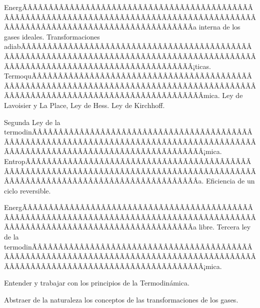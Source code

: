 \begin{sumilla}
\begin{unit}
\begin{topicos}
      \item EnergÃÂÃÂÃÂÃÂÃÂÃÂÃÂÃÂÃÂÃÂÃÂÃÂÃÂÃÂÃÂÃÂÃÂÃÂÃÂÃÂÃÂÃÂÃÂÃÂÃÂÃÂÃÂÃÂÃÂÃÂÃÂÃÂÃÂÃÂÃÂÃÂÃÂÃÂÃÂÃÂÃÂÃÂÃÂÃÂÃÂÃÂÃÂÃÂÃÂÃÂÃÂÃÂÃÂÃÂÃÂÃÂÃÂÃÂÃÂÃÂÃÂÃÂÃÂÃÂ­a interna de los gases ideales. Transformaciones adiabÃÂÃÂÃÂÃÂÃÂÃÂÃÂÃÂÃÂÃÂÃÂÃÂÃÂÃÂÃÂÃÂÃÂÃÂÃÂÃÂÃÂÃÂÃÂÃÂÃÂÃÂÃÂÃÂÃÂÃÂÃÂÃÂÃÂÃÂÃÂÃÂÃÂÃÂÃÂÃÂÃÂÃÂÃÂÃÂÃÂÃÂÃÂÃÂÃÂÃÂÃÂÃÂÃÂÃÂÃÂÃÂÃÂÃÂÃÂÃÂÃÂÃÂÃÂÃÂ¡ticas. TermoquÃÂÃÂÃÂÃÂÃÂÃÂÃÂÃÂÃÂÃÂÃÂÃÂÃÂÃÂÃÂÃÂÃÂÃÂÃÂÃÂÃÂÃÂÃÂÃÂÃÂÃÂÃÂÃÂÃÂÃÂÃÂÃÂÃÂÃÂÃÂÃÂÃÂÃÂÃÂÃÂÃÂÃÂÃÂÃÂÃÂÃÂÃÂÃÂÃÂÃÂÃÂÃÂÃÂÃÂÃÂÃÂÃÂÃÂÃÂÃÂÃÂÃÂÃÂÃÂ­mica. Ley de Lavoisier y La Place, Ley de Hess. Ley de Kirchhoff.
      \item Segunda Ley de la termodinÃÂÃÂÃÂÃÂÃÂÃÂÃÂÃÂÃÂÃÂÃÂÃÂÃÂÃÂÃÂÃÂÃÂÃÂÃÂÃÂÃÂÃÂÃÂÃÂÃÂÃÂÃÂÃÂÃÂÃÂÃÂÃÂÃÂÃÂÃÂÃÂÃÂÃÂÃÂÃÂÃÂÃÂÃÂÃÂÃÂÃÂÃÂÃÂÃÂÃÂÃÂÃÂÃÂÃÂÃÂÃÂÃÂÃÂÃÂÃÂÃÂÃÂÃÂÃÂ¡mica. EntropÃÂÃÂÃÂÃÂÃÂÃÂÃÂÃÂÃÂÃÂÃÂÃÂÃÂÃÂÃÂÃÂÃÂÃÂÃÂÃÂÃÂÃÂÃÂÃÂÃÂÃÂÃÂÃÂÃÂÃÂÃÂÃÂÃÂÃÂÃÂÃÂÃÂÃÂÃÂÃÂÃÂÃÂÃÂÃÂÃÂÃÂÃÂÃÂÃÂÃÂÃÂÃÂÃÂÃÂÃÂÃÂÃÂÃÂÃÂÃÂÃÂÃÂÃÂÃÂ­a. Eficiencia de un ciclo reversible.
	\item EnergÃÂÃÂÃÂÃÂÃÂÃÂÃÂÃÂÃÂÃÂÃÂÃÂÃÂÃÂÃÂÃÂÃÂÃÂÃÂÃÂÃÂÃÂÃÂÃÂÃÂÃÂÃÂÃÂÃÂÃÂÃÂÃÂÃÂÃÂÃÂÃÂÃÂÃÂÃÂÃÂÃÂÃÂÃÂÃÂÃÂÃÂÃÂÃÂÃÂÃÂÃÂÃÂÃÂÃÂÃÂÃÂÃÂÃÂÃÂÃÂÃÂÃÂÃÂÃÂ­a libre. Tercera ley de la termodinÃÂÃÂÃÂÃÂÃÂÃÂÃÂÃÂÃÂÃÂÃÂÃÂÃÂÃÂÃÂÃÂÃÂÃÂÃÂÃÂÃÂÃÂÃÂÃÂÃÂÃÂÃÂÃÂÃÂÃÂÃÂÃÂÃÂÃÂÃÂÃÂÃÂÃÂÃÂÃÂÃÂÃÂÃÂÃÂÃÂÃÂÃÂÃÂÃÂÃÂÃÂÃÂÃÂÃÂÃÂÃÂÃÂÃÂÃÂÃÂÃÂÃÂÃÂÃÂ¡mica.
   \end{topicos}

   \begin{objetivos}
      \item Entender y trabajar con los principios de la Termodin\'amica.
      \item Abstraer de la naturaleza los conceptos de las transformaciones de los gases.
   \end{objetivos}
\end{unit}


\end{sumilla}
